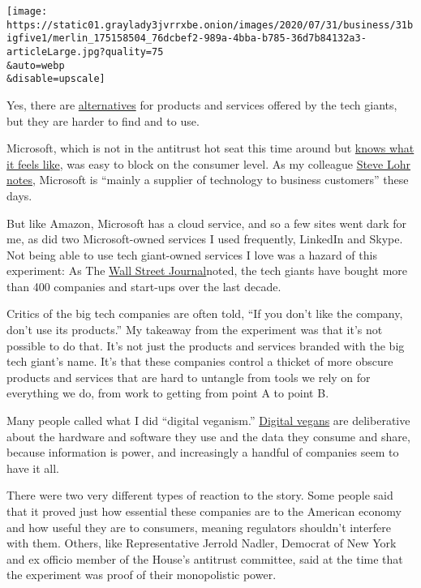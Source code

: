\texttt{[image: https://static01.graylady3jvrrxbe.onion/images/2020/07/31/business/31bigfive1/merlin\_175158504\_76dcbef2-989a-4bba-b785-36d7b84132a3-articleLarge.jpg?quality=75\\\&auto=webp\\\&disable=upscale]}

Yes, there are
\href{https://www.nytimes3xbfgragh.onion/2020/07/29/technology/personaltech/big-tech-power-how-to-fight.html}{alternatives}
for products and services offered by the tech giants, but they are
harder to find and to use.

Microsoft, which is not in the antitrust hot seat this time around but
\href{https://www.nytimes3xbfgragh.onion/2019/06/23/technology/antitrust-tech-microsoft-lessons.html}{knows
what it feels like}, was easy to block on the consumer level. As my
colleague
\href{https://www.nytimes3xbfgragh.onion/2018/11/29/technology/microsoft-apple-worth-how.html}{Steve
Lohr notes}, Microsoft is ``mainly a supplier of technology to business
customers'' these days.

But like Amazon, Microsoft has a cloud service, and so a few sites went
dark for me, as did two Microsoft-owned services I used frequently,
LinkedIn and Skype. Not being able to use tech giant-owned services I
love was a hazard of this experiment: As The
\href{https://www.wsj.com/articles/beware-the-big-tech-backlash-11545227197?mod=e2tw}{Wall
Street Journal}noted, the tech giants have bought more than 400
companies and start-ups over the last decade.

Critics of the big tech companies are often told, ``If you don't like
the company, don't use its products.'' My takeaway from the experiment
was that it's not possible to do that. It's not just the products and
services branded with the big tech giant's name. It's that these
companies control a thicket of more obscure products and services that
are hard to untangle from tools we rely on for everything we do, from
work to getting from point A to point B.

Many people called what I did ``digital veganism.''
\href{https://observer.com/2011/06/what-is-digital-veganism-cody-brown-explains-his-catchphrase/}{Digital
vegans} are deliberative about the hardware and software they use and
the data they consume and share, because information is power, and
increasingly a handful of companies seem to have it all.

There were two very different types of reaction to the story. Some
people said that it proved just how essential these companies are to the
American economy and how useful they are to consumers, meaning
regulators shouldn't interfere with them. Others, like Representative
Jerrold Nadler, Democrat of New York and ex officio member of the
House's antitrust committee, said at the time that the experiment was
proof of their monopolistic power.

